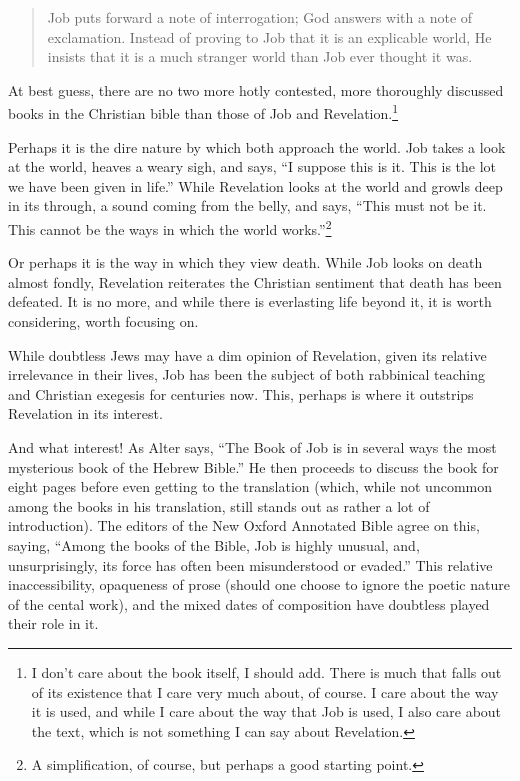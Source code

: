\begin{quote}
Job puts forward a note of interrogation; God answers with a note of exclamation. Instead of proving to Job that it is an explicable world, He insists that it is a much stranger world than Job ever thought it was.

\parencite{intro-to-job}
\end{quote}

At best guess, there are no two more hotly contested, more thoroughly discussed books in the Christian bible than those of Job and Revelation.\footnote{I don't care about the book itself, I should add. There is much that falls out of its existence that I care very much about, of course. I care about the way it is used, and while I care about the way that Job is used, I also care about the text, which is not something I can say about Revelation.}

Perhaps it is the dire nature by which both approach the world. Job takes a look at the world, heaves a weary sigh, and says, ``I suppose this is it. This is the lot we have been given in life.'' While Revelation looks at the world and growls deep in its through, a sound coming from the belly, and says, ``This must not be it. This cannot be the ways in which the world works.''\footnote{A simplification, of course, but perhaps a good starting point.}

Or perhaps it is the way in which they view death. While Job looks on death almost fondly, Revelation reiterates the Christian sentiment that death has been defeated. It is no more, and while there is everlasting life beyond it, it is worth considering, worth focusing on.

While doubtless Jews may have a dim opinion of Revelation, given its relative irrelevance in their lives, Job has been the subject of both rabbinical teaching and Christian exegesis for centuries now. This, perhaps is where it outstrips Revelation in its interest.

And what interest! As Alter says, ``The Book of Job is in several ways the most mysterious book of the Hebrew Bible.'' \parencite[457]{alter} He then proceeds to discuss the book for eight pages before even getting to the translation (which, while not uncommon among the books in his translation, still stands out as rather a lot of introduction). The editors of the New Oxford Annotated Bible agree on this, saying, ``Among the books of the Bible, Job is highly unusual, and, unsurprisingly, its force has often been misunderstood or evaded.'' \parencite[735]{noab} This relative inaccessibility, opaqueness of prose (should one choose to ignore the poetic nature of the cental work), and the mixed dates of composition have doubtless played their role in it.

